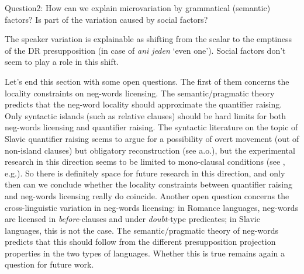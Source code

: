   
\ea\label{ex-24} Question2: \ea How can we explain microvariation by grammatical
  (semantic) factors? \ex Is part of the variation caused by social
  factors? \z\z
  
\ea\label{ex-25} The speaker variation is explainable as shifting from the scalar to
  the emptiness of the DR presupposition (in case of \emph{ani jeden}
  `even one'). \ea Social factors don't seem to play a role in this shift.\z\z
  
Let's end this section with some open questions. The first of them concerns the locality constraints on neg-words licensing. The semantic/pragmatic theory predicts that the neg-word locality should approximate the quantifier raising. Only syntactic islands (such as relative clauses) should be hard limits for both neg-words licensing and quantifier raising. The syntactic literature on the topic of Slavic quantifier raising seems to argue for a possibility of overt movement (out of non-island clauses) but obligatory reconstruction (see \cite{neeleman2009focus} a.o.), but the experimental research in this direction seems to be limited to mono-clausal conditions (see \cite{ionin2018focus}, e.g.). So there is definitely space for future research in this direction, and only then can we conclude whether the locality constraints between quantifier raising and neg-words licensing really do coincide. Another open question concerns the cross-linguistic variation in neg-words licensing: in Romance languages, neg-words are licensed in \textit{before}-clauses and under \textit{doubt}-type predicates; in Slavic languages, this is not the case. The semantic/pragmatic theory of neg-words predicts that this should follow from the different presupposition projection properties in the two types of languages. Whether this is true remains again a question for future work.
  